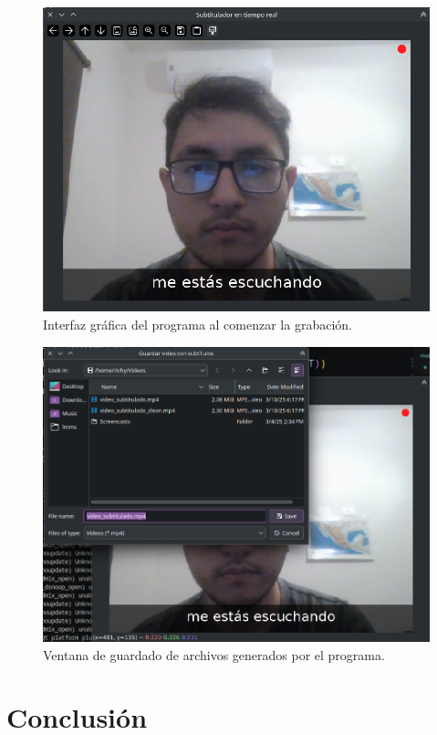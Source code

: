 \documentclass[conference]{IEEEtran}
\begin{document}
\begin{figure}[ht]
    \centering
    \includegraphics[width=\columnwidth]{images/rec-UI.png}
    \caption{Interfaz gráfica del programa al comenzar la grabación.}
    \label{fig:rec-UI}
\end{figure}

\begin{figure}[ht]
    \centering
    \includegraphics[width=\columnwidth]{images/save-window.png}
    \caption{Ventana de guardado de archivos generados por el programa.}
    \label{fig:save-window}
\end{figure}

\section{Conclusión}


\nocite{calcularRangos}
\printbibliography
\end{document}
